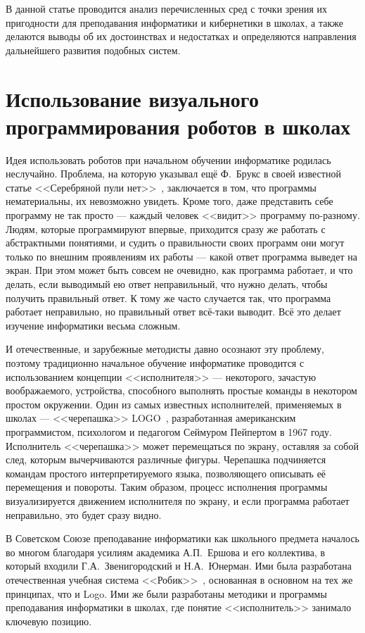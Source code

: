 \documentclass[a4paper]{article}
\begin{document}
В данной  статье проводится анализ перечисленных сред с точки зрения их пригодности для преподавания информатики и кибернетики в школах, а также делаются выводы об их достоинствах и недостатках и определяются направления дальнейшего развития подобных систем.

\section{Использование визуального программирования роботов в школах}
Идея использовать роботов при начальном обучении информатике родилась неслучайно. Проблема, на которую указывал ещё Ф.~Брукс в своей известной статье <<Серебряной пули нет>>~\cite{mythicalManMonth}, заключается в том, что программы нематериальны, их невозможно увидеть. Кроме того, даже представить себе программу не так просто --- каждый человек <<видит>> программу по-разному. Людям, которые программируют впервые, приходится сразу же работать с абстрактными понятиями, и судить о правильности своих программ они могут только по внешним проявлениям их работы --- какой ответ программа выведет на экран. При этом может быть совсем не очевидно, как программа работает, и что делать, если выводимый ею ответ неправильный, что нужно делать, чтобы получить правильный ответ. К тому же часто случается так, что программа работает неправильно, но правильный ответ всё-таки выводит. Всё это делает изучение информатики весьма сложным.

И отечественные, и зарубежные методисты давно осознают эту проблему, поэтому традиционно начальное обучение информатике проводится с использованием концепции <<исполнителя>> --- некоторого, зачастую воображаемого, устройства, способного выполнять простые команды в некотором простом окружении. Один из самых известных исполнителей, применяемых в школах --- <<черепашка>> LOGO~\cite{logo}, разработанная американским программистом, психологом и педагогом Сеймуром Пейпертом в 1967 году. Исполнитель <<черепашка>> может перемещаться по экрану, оставляя за собой след, которым вычерчиваются различные фигуры. Черепашка подчиняется командам простого интерпретируемого языка, позволяющего описывать её перемещения и повороты. Таким образом, процесс исполнения программы визуализируется движением исполнителя по экрану, и если программа работает неправильно, это будет сразу видно. 

В Советском Союзе преподавание информатики как школьного предмета началось во многом благодаря усилиям академика А.П.~Ершова и его коллектива, в который входили Г.А.~Звенигородский и Н.А.~Юнерман. Ими была разработана отечественная учебная система <<Робик>>~\cite{robik}, основанная в основном на тех же принципах, что и Logo. Ими же были разработаны методики и программы преподавания информатики в школах, где понятие <<исполнитель>> занимало ключевую позицию.
\end{document}
